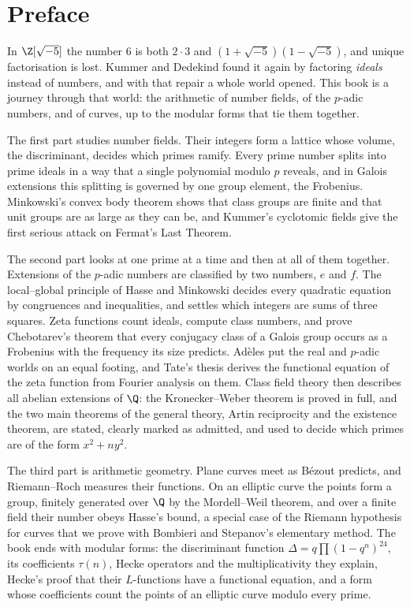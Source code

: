 \chapter*{Preface}
In $\Z[\sqrt{-5}]$ the number $6$ is both $2\cdot3$ and $(1+\sqrt{-5})(1-\sqrt{-5})$, and unique factorisation is lost.
Kummer and Dedekind found it again by factoring \emph{ideals} instead of numbers, and with that repair a whole world
opened. This book is a journey through that world: the arithmetic of number fields, of the $p$-adic numbers, and of
curves, up to the modular forms that tie them together.

The first part studies number fields. Their integers form a lattice whose volume, the discriminant, decides which primes
ramify. Every prime number splits into prime ideals in a way that a single polynomial modulo $p$ reveals, and in Galois
extensions this splitting is governed by one group element, the Frobenius. Minkowski's convex body theorem shows that
class groups are finite and that unit groups are as large as they can be, and Kummer's cyclotomic fields give the
first serious attack on Fermat's Last Theorem.

The second part looks at one prime at a time and then at all of them together. Extensions of the $p$-adic numbers are
classified by two numbers, $e$ and $f$. The local--global principle of Hasse and Minkowski decides every quadratic
equation by congruences and inequalities, and settles which integers are sums of three squares. Zeta functions count
ideals, compute class numbers, and prove Chebotarev's theorem that every conjugacy class of a Galois group occurs as a
Frobenius with the frequency its size predicts. Ad\`eles put the real and $p$-adic worlds on an equal footing, and
Tate's thesis derives the functional equation of the zeta function from Fourier analysis on them. Class field theory
then describes all abelian extensions of $\Q$: the Kronecker--Weber theorem is proved in full, and the two main theorems
of the general theory, Artin reciprocity and the existence theorem, are stated, clearly marked as admitted, and used to
decide which primes are of the form $x^2+ny^2$.

The third part is arithmetic geometry. Plane curves meet as Bézout predicts, and Riemann--Roch measures their functions.
On an elliptic curve the points form a group, finitely generated over $\Q$ by the Mordell--Weil theorem, and over a
finite field their number obeys Hasse's bound, a special case of the Riemann hypothesis for curves that we prove with
Bombieri and Stepanov's elementary method. The book ends with modular forms: the discriminant function
$\Delta=q\prod(1-q^n)^{24}$, its coefficients $\tau(n)$, Hecke operators and the multiplicativity they explain,
Hecke's proof that their $L$-functions have a functional equation, and a form whose coefficients count the points of an
elliptic curve modulo every prime.

